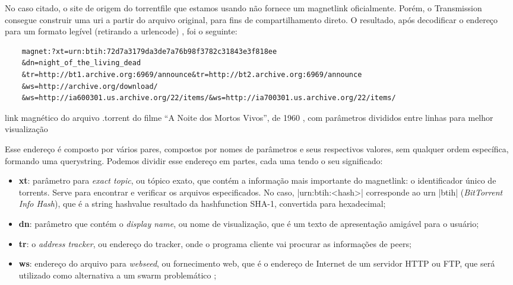 No caso citado, o site de origem do \gls*{torrentfile} que estamos usando não fornece um
\gls*{magnetlink} oficialmente. Porém, o Transmission consegue construir uma \gls*{uri}
a partir do arquivo original, para fins de compartilhamento direto. O resultado, após
decodificar o endereço para um formato legível (retirando a \gls{urlencode})
\cite{wiki:urlencode}, foi o seguinte:

\begin{listing}[ht!]
    \begin{verbatim}
    magnet:?xt=urn:btih:72d7a3179da3de7a76b98f3782c31843e3f818ee
    &dn=night_of_the_living_dead
    &tr=http://bt1.archive.org:6969/announce&tr=http://bt2.archive.org:6969/announce
    &ws=http://archive.org/download/
    &ws=http://ia600301.us.archive.org/22/items/&ws=http://ia700301.us.archive.org/22/items/
    \end{verbatim}
    \caption{link magnético do arquivo .torrent do filme
    \enquote{A Noite dos Mortos Vivos}, de 1960 \cite{torrent-file}, com parâmetros
    divididos entre linhas para melhor visualização}
    \label{lst:torrent-file-magnet-link}
\end{listing}

Esse endereço é composto por vários pares, compostos por nomes de parâmetros e seus
respectivos valores, sem qualquer ordem específica, formando uma \gls{querystring}.
Podemos dividir esse endereço em partes, cada uma tendo o seu significado:

\begin{itemize}
    \item \textbf{xt}: parâmetro para \emph{exact topic}, ou tópico exato, que contém a
        informação mais importante do \gls*{magnetlink}: o identificador único de
        \glspl*{torrent}. Serve para encontrar e verificar os arquivos especificados.
        No caso, \bverb|urn:btih:<hash>| corresponde ao \gls{urn} \sverb|btih|
        (\emph{BitTorrent Info Hash}), que é a \gls*{string} \gls{hashvalue} resultado
        da \gls{hashfunction} SHA-1, convertida para hexadecimal;

    \item \textbf{dn}: parâmetro que contém o \emph{display name}, ou nome de
        visualização, que é um texto de apresentação amigável para o usuário;

    \item \textbf{tr}: o \emph{address tracker}, ou endereço do \gls*{tracker}, onde o
        programa cliente vai procurar as informações de \glspl*{peer};

    \item \textbf{ws}: endereço do arquivo para \emph{webseed}, ou fornecimento web,
        que é o endereço de Internet de um servidor HTTP ou FTP, que será utilizado como
        alternativa a um \gls*{swarm} problemático \cite{wiki:torrent};
\end{itemize}

